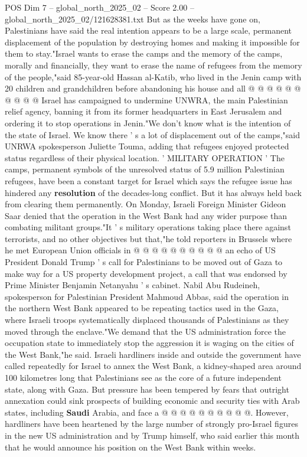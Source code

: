 \begin{textsample}{POS Dim 7 – global\_north\_2025\_02 – Score 2.00 – global\_north\_2025\_02/121628381.txt}
But as the weeks have gone on, Palestinians have said the real intention appears to be a large scale, permanent displacement of the population by destroying homes and making it impossible for them to stay."Israel wants to erase the camps and the memory of the camps, morally and financially, they want to erase the name of refugees from the memory of the people,"said 85-year-old Hassan al-Katib, who lived in the Jenin camp with 20 children and grandchildren before abandoning his house and all @ @ @ @ @ @ @ @ @ @ Israel has campaigned to undermine UNWRA, the main Palestinian relief agency, banning it from its former headquarters in East Jerusalem and ordering it to stop operations in Jenin."We don't know what is the intention of the state of Israel.
We know there ' s a lot of displacement out of the camps,"said UNRWA spokesperson Juliette Touma, adding that refugees enjoyed protected status regardless of their physical location. ' MILITARY OPERATION ' The camps, permanent symbols of the unresolved status of 5.9 million Palestinian refugees, have been a constant target for Israel which says the refugee issue has hindered any \textbf{resolution} of the decades-long conflict.
But it has always held back from clearing them permanently.
On Monday, Israeli Foreign Minister Gideon Saar denied that the operation in the West Bank had any wider purpose than combating militant groups."It ' s military operations taking place there against terrorists, and no other objectives but that,"he told reporters in Brussels where he met European Union officials in @ @ @ @ @ @ @ @ @ @ an echo of US President Donald Trump ' s call for Palestinians to be moved out of Gaza to make way for a US property development project, a call that was endorsed by Prime Minister Benjamin Netanyahu ' s cabinet.
Nabil Abu Rudeineh, spokesperson for Palestinian President Mahmoud Abbas, said the operation in the northern West Bank appeared to be repeating tactics used in the Gaza, where Israeli troops systematically displaced thousands of Palestinians as they moved through the enclave."We demand that the US administration force the occupation state to immediately stop the aggression it is waging on the cities of the West Bank,"he said.
Israeli hardliners inside and outside the government have called repeatedly for Israel to annex the West Bank, a kidney-shaped area around 100 kilometres long that Palestinians see as the core of a future independent state, along with Gaza.
But pressure has been tempered by fears that outright annexation could sink prospects of building economic and security ties with Arab states, including \textbf{Saudi} Arabia, and face a @ @ @ @ @ @ @ @ @ @.
However, hardliners have been heartened by the large number of strongly pro-Israel figures in the new US administration and by Trump himself, who said earlier this month that he would announce his position on the West Bank within weeks.

\end{textsample}
